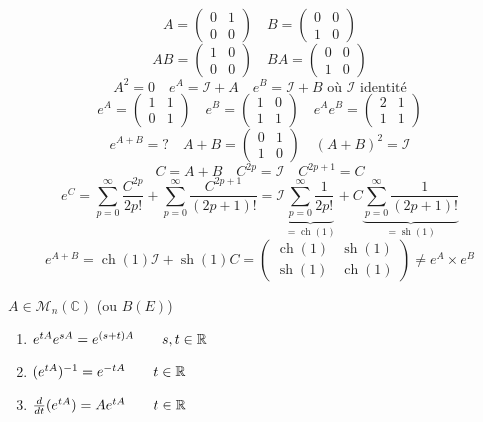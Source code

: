 \begin{remark}
   \[
        A = \begin{pmatrix} 
            0 & 1\\
            0 & 0
        \end{pmatrix}  
        \quad
        B = \begin{pmatrix} 
            0 & 0 \\
            1 & 0
        \end{pmatrix} 
   \]  
   \[
       AB = \begin{pmatrix} 1 & 0 \\ 0 & 0 \end{pmatrix} 
       \quad 
       BA = \begin{pmatrix} 0 & 0 \\ 1 & 0 \end{pmatrix} 
   \] 
   \[
       A^2 = 0 \quad e^A = \mathcal{I} + A \quad e^B = \mathcal{I} + B \text{ où } \mathcal{I} \text{ identité}
   \] 
   \[
       e^A = \begin{pmatrix} 1 & 1 \\ 0 & 1 \end{pmatrix} 
       \quad 
       e^B = \begin{pmatrix} 1 & 0 \\ 1 & 1 \end{pmatrix} 
       \quad 
       e^Ae^B = \begin{pmatrix} 2 & 1 \\ 1 & 1 \end{pmatrix} 
   \] 
   \[
       e^{A+B} = ? \quad A + B = \begin{pmatrix} 0 & 1 \\ 1 & 0 \end{pmatrix} \quad (A + B)^2 = \mathcal{I}
   \] 
   \[
       C = A+B \quad C^{2p} = \mathcal{I} \quad C^{2p + 1} = C
   \] 
   \[
       e^C = \sum_{p=0}^{\infty} \frac{C^{2p}}{2p!} + \sum_{p=0}^{\infty} \frac{C^{2p + 1}}{(2p + 1)!} = \mathcal{I}\underbrace{\sum_{p=0}^{\infty} \frac{1}{2p!}}_{= \operatorname{ch}(1)} + C\underbrace{\sum_{p=0}^{\infty} \frac{1}{(2p + 1)!}}_{= \operatorname{sh}(1)}
   \] 
   \[
       e^{A + B} = \operatorname{ch}(1) \mathcal{I} + \operatorname{sh}(1)C = \begin{pmatrix} \operatorname{ch}(1) & \operatorname{sh}(1) \\ \operatorname{sh}(1) & \operatorname{ch}(1) \end{pmatrix} \neq e^A \times e^B
   \] 
\end{remark}
\begin{prop}
    $A \in \mathcal{M}_n(\mathbb{C})$ (ou $B(E)$)
    \begin{enumerate}
        \item $e^{tA}e^{sA} = e^{(s + t)A} \qquad s,t \in \mathbb{R}$ 
        \item $(e^{tA})^{-1} = e^{-tA} \qquad  t \in \mathbb{R}$
        \item $\frac{d}{dt}(e^{tA}) = Ae^{tA} \qquad t \in \mathbb{R}$
    \end{enumerate}
\end{prop}
